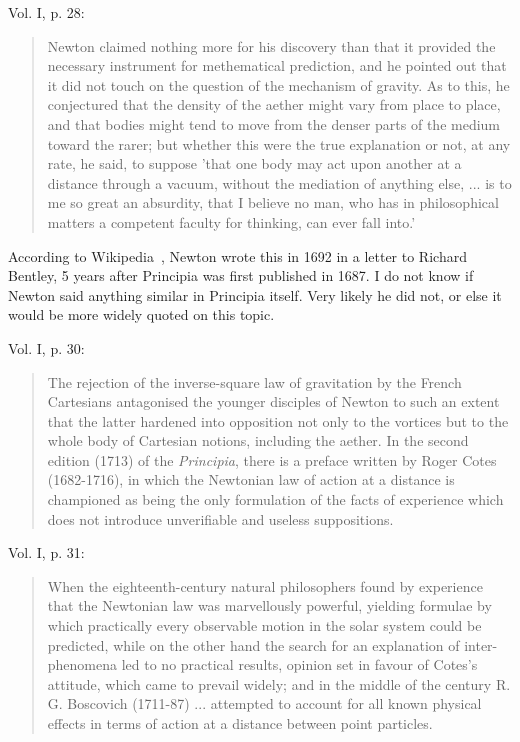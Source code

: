 \documentclass[a4paper]{article}
\theoremstyle{plain}
\theoremstyle{definition}
\begin{document}
Vol. I, p. 28:

\begin{quote}
  Newton claimed nothing more for his discovery than that it provided
  the necessary instrument for methematical prediction, and he pointed out
  that it did not touch on the question of the mechanism of gravity.
  As to this, he conjectured that the density of the aether might vary from
  place to place, and that bodies might tend to move from the denser parts
  of the medium toward the rarer; but whether this were the true explanation
  or not, at any rate, he said, to suppose 'that one body may act upon
  another at a distance through a vacuum, without the mediation of anything
  else, ... is to me so great an absurdity, that I believe no man, who has
  in philosophical matters a competent faculty for thinking, can ever fall
  into.'
\end{quote}

According to Wikipedia~\cite{WikipediaNewtonLawOfGravity}, Newton
wrote this in 1692 in a letter to Richard Bentley, 5 years after
Principia was first published in 1687.  I do not know if Newton said
anything similar in Principia itself.  Very likely he did not, or else
it would be more widely quoted on this topic.

Vol. I, p. 30:

\begin{quote}
  The rejection of the inverse-square law of gravitation by the French
  Cartesians antagonised the younger disciples of Newton to such an
  extent that the latter hardened into opposition not only to the
  vortices but to the whole body of Cartesian notions, including the
  aether.  In the second edition (1713) of the {\em Principia}, there
  is a preface written by Roger Cotes (1682-1716), in which the
  Newtonian law of action at a distance is championed as being the
  only formulation of the facts of experience which does not introduce
  unverifiable and useless suppositions.
\end{quote}

Vol. I, p. 31:

\begin{quote}
  When the eighteenth-century natural philosophers found by experience
  that the Newtonian law was marvellously powerful, yielding formulae
  by which practically every observable motion in the solar system
  could be predicted, while on the other hand the search for an
  explanation of inter-phenomena led to no practical results, opinion
  set in favour of Cotes's attitude, which came to prevail widely; and
  in the middle of the century R. G. Boscovich (1711-87) ... attempted
  to account for all known physical effects in terms of action at a
  distance between point particles.
\end{quote}





	
\end{document}
